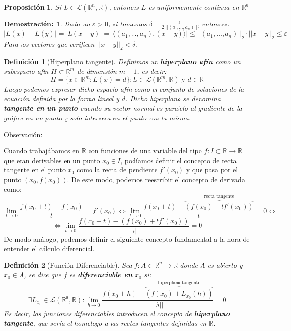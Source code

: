 \documentclass[10pt,a4paper,openright]{book}
\theoremstyle{break}
\newtheorem*{defi}{Definición}
\newtheorem*{prop}{Proposición}
\newtheorem*{demo}{\underline{Demostración}:}
\begin{document}
\begin{prop}
Si $L \in \mathcal{L} (\mathbb{R}^n, \mathbb{R})$, entonces $L$ es uniformemente continua en $\mathbb{R}^n$
\end{prop}

\begin{demo}
Dado un $\varepsilon >0$, si tomamos $\delta = \frac{\varepsilon}{2||| (a_1, \ldots, a_n)||}$, entonces:
$$|L(x) - L(y)| = |L(x-y)| = |\langle (a_1, \ldots, a_n), (x-y)\rangle| \leq || (a_1, \ldots, a_n)||_2 \cdot || x-y||_2 \leq \varepsilon$$
Para los vectores que verifican $|| x-y||_2 < \delta$.
\end{demo}

\begin{defi}[Hiperplano tangente]
Definimos un \textbf{hiperplano afín} como un subespacio afín $H \subset \mathbb{R}^m$ de dimensión $m-1$, es decir:
$$H = \{x \in \mathbb{R}^m : L(x) = d \} : L \in \mathcal{L}(\mathbb{R}^m, \mathbb{R}) \mbox{ y } d \in \mathbb{R}$$
Luego podemos expresar dicho espacio afín como el conjunto de soluciones de la ecuación definida por la forma lineal y $d$. Dicho hiperplano se denomina \textbf{tangente en un punto} cuando su vector normal es paralelo al gradiente de la gráfica en un punto y solo interseca en el punto con la misma.
\end{defi}

\underline{Observación}:

Cuando trabajábamos en $\mathbb{R}$ con funciones de una variable del tipo $f: I \subset \mathbb{R} \to \mathbb{R}$ que eran derivables en un punto $x_0 \in I$, podíamos definir el concepto de recta tangente en el punto $x_0$ como la recta de pendiente $f'(x_0)$ y que pasa por el punto $(x_0, f(x_0))$. De este modo, podemos reescribir el concepto de derivada como:
$$  \lim_{t\rightarrow 0} \frac{f(x_0 + t) - f(x_0)}{t} = f'(x_0) \Leftrightarrow \lim_{t\rightarrow 0} \frac{f(x_0 + t) - \overbrace{(f(x_0) + tf'(x_0))}^{\mbox{recta tangente}}}{t} = 0 \Leftrightarrow$$
$$ \Leftrightarrow \lim_{t\rightarrow 0} \frac{f(x_0 + t) - (f(x_0) + tf'(x_0))}{|t|} = 0$$
De modo análogo, podemos definir el siguiente concepto fundamental a la hora de entender el cálculo diferencial.

\begin{defi}[Función Diferenciable]
Sea $f: A \subset \mathbb{R}^n \to \mathbb{R}$ donde $A$ es abierto y $x_0 \in A$, se dice que $f$ es \textbf{diferenciable en $x_0$} si:
$$\exists L_{x_0} \in \mathcal{L}(\mathbb{R}^n, \mathbb{R}) : \lim_{h\rightarrow 0} \frac{f(x_0 + h) - \overbrace{\left( f(x_0) + L_{x_0}(h)\right)}^{\mbox{hiperplano tangente}}}{||h||}  = 0$$
Es decir, las funciones diferenciables introducen el concepto de \textbf{hiperplano tangente}, que sería el homólogo a las rectas tangentes definidas en $\mathbb{R}$.
\end{defi}
\end{document}
